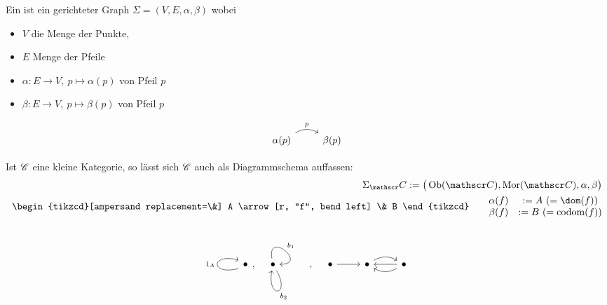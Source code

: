 \begin{definition}\enter
	Ein  ist ein gerichteter Graph $\Sigma=(V,E,\alpha,\beta)$ wobei 
	\begin{itemize}
		\item $V$ die Menge der Punkte,
		\item $E$ Menge der Pfeile
		\item $\alpha:E\to V,~p\mapsto\alpha(p)$  von Pfeil $p$
		\item $\beta:E\to V,~p\mapsto\beta(p)$  von Pfeil $p$
	\end{itemize}
	$$
	\begin{tikzcd}
\alpha(p) \arrow[r, "p", bend left] & \beta(p)
\end{tikzcd}
$$
\end{definition}\enter
Ist $\mathscr C$ eine kleine Kategorie, so lässt sich $\mathscr C$ auch als Diagrammschema auffassen:
\begin{align*}
	\Sigma_\Cat:=\big(\Ob(\Cat),\Mor(\Cat),\alpha,\beta\big)\\
		\begin{tikzcd}[ampersand replacement=\&]
A \arrow[r, "f", bend left] \& B
\end{tikzcd}\qquad\begin{matrix}
	\alpha(f)& :=A~(=\dom(f))\\
	\beta(f)&:=B~(=\codom(f))
\end{matrix}
\end{align*}

\begin{bsp}
    \[
        \begin{tikzcd}
            \bullet
            \arrow[loop left, "{1_A}", distance=3em, start anchor={[yshift=-1ex]west}, end anchor={[yshift=1ex]west}]
        \end{tikzcd},\quad
        \begin{tikzcd}
            \bullet
            \arrow[out=100, in=0, loop, distance=3em, "{b_1}"]
            \arrow[out=300, in=260, loop, distance=3em, "{b_2}"]
        \end{tikzcd},\quad
        \begin{tikzcd}
            \bullet
                \arrow[r]
            &
            \bullet
                \arrow[r, bend left]
            &
            \bullet
                \arrow[l]
                \arrow[l, bend left]
        \end{tikzcd}
    \]
\end{bsp}


